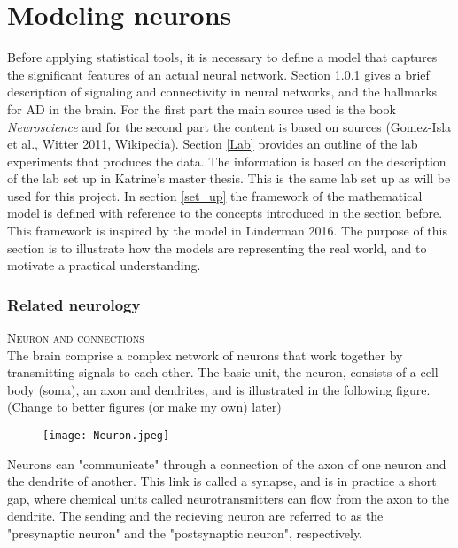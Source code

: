 
\chapter{Modeling neurons}

Before applying statistical tools, it is necessary to define a model that captures the significant features of an actual neural network. Section \ref{structure_nn} gives a brief description of signaling and connectivity in neural networks, and the hallmarks for AD in the brain. For the first part the main source used is the book \textit{Neuroscience} \cite{Purves} and for the second part the content is based on sources (Gomez-Isla et al., Witter 2011, Wikipedia). Section \ref{Lab} provides an outline of the lab experiments that produces the data. The information is based on the description of the lab set up in Katrine's master thesis. This is the same lab set up as will be used for this project. In section \ref{set_up} the  framework of the mathematical model is defined with reference to the concepts introduced in the section before. This framework is inspired by the model in Linderman 2016. The purpose of this section is to illustrate how the models are representing the real world, and to motivate a practical understanding. 



\subsection{Related neurology}
\label{structure_nn}

\textsc{Neuron and connections}\\
The brain comprise a complex network of neurons that work together by transmitting signals to each other. The basic unit, the neuron, 
 consists of a cell body (soma), an axon and dendrites, and is illustrated in the following figure.  (Change to better figures (or make my own) later)
\begin{figure}[h]
    \centering
    \texttt{[image: Neuron.jpeg]}
\end{figure} 

Neurons can "communicate" through a connection of the axon of one neuron and the dendrite of another. This link is called a synapse, and is in practice a short gap, where chemical units called neurotransmitters can flow from the axon to the dendrite. The sending and the recieving neuron are referred to as the "presynaptic neuron" and the "postsynaptic neuron", respectively. 

